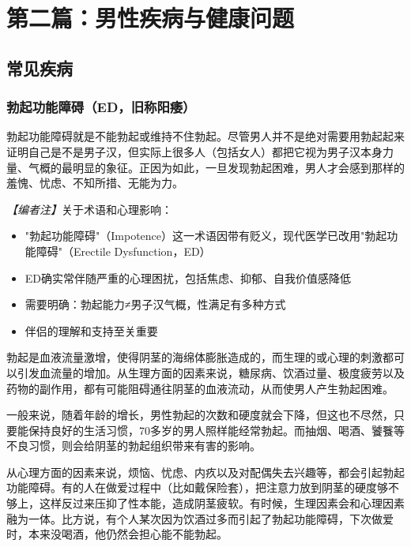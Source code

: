 \part{第二篇：男性疾病与健康问题}

\chapter{常见疾病}

\section{勃起功能障碍（ED，旧称阳痿）}

勃起功能障碍就是不能勃起或维持不住勃起。尽管男人并不是绝对需要用勃起起来证明自己是不是男子汉，但实际上很多人（包括女人）都把它视为男子汉本身力量、气概的最明显的象征。正因为如此，一旦发现勃起困难，男人才会感到那样的羞愧、忧虑、不知所措、无能为力。

\noindent\textit{【编者注】}关于术语和心理影响：
\begin{itemize}
	\item "勃起功能障碍"（Impotence）这一术语因带有贬义，现代医学已改用"勃起功能障碍"（Erectile Dysfunction，ED）
	\item ED确实常伴随严重的心理困扰，包括焦虑、抑郁、自我价值感降低
	\item 需要明确：勃起能力≠男子汉气概，性满足有多种方式
	\item 伴侣的理解和支持至关重要
\end{itemize}

勃起是血液流量激增，使得阴茎的海绵体膨胀造成的，而生理的或心理的刺激都可以引发血流量的增加。从生理方面的因素来说，糖尿病、饮酒过量、极度疲劳以及药物的副作用，都有可能阻碍通往阴茎的血液流动，从而使男人产生勃起困难。

一般来说，随着年龄的增长，男性勃起的次数和硬度就会下降，但这也不尽然，只要能保持良好的生活习惯，70多岁的男人照样能经常勃起。而抽烟、喝酒、饕餮等不良习惯，则会给阴茎的勃起组织带来有害的影响。

从心理方面的因素来说，烦恼、忧虑、内疚以及对配偶失去兴趣等，都会引起勃起功能障碍。有的人在做爱过程中（比如戴保险套），把注意力放到阴茎的硬度够不够上，这样反过来压抑了性本能，造成阴茎疲软。有时候，生理因素会和心理因素融为一体。比方说，有个人某次因为饮酒过多而引起了勃起功能障碍，下次做爱时，本来没喝酒，他仍然会担心能不能勃起。

